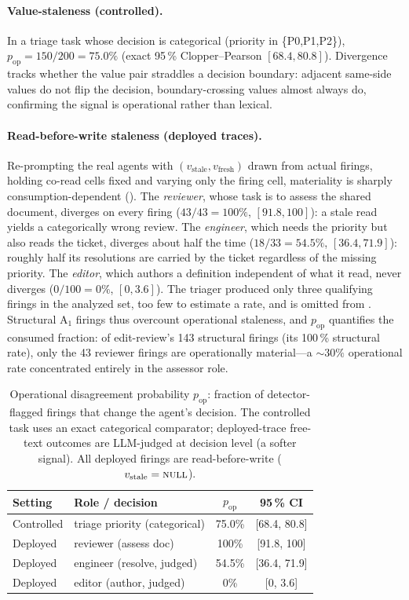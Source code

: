 \documentclass[journal,compsoc,10pt]{IEEEtran}
\theoremstyle{definition}
\theoremstyle{remark}
\begin{document}
\paragraph{Value-staleness (controlled).} In a triage task whose decision
is categorical (priority in \{P0,P1,P2\}), $p_{\text{op}} = 150/200 =
75.0\%$ (exact 95\,\% Clopper--Pearson $[68.4,80.8]$). Divergence tracks
whether the value pair straddles a decision boundary: adjacent same-side
values do not flip the decision, boundary-crossing values almost always
do, confirming the signal is operational rather than lexical.

\paragraph{Read-before-write staleness (deployed traces).} Re-prompting
the real agents with $(v_{\text{stale}},v_{\text{fresh}})$ drawn from
actual firings, holding co-read cells fixed and varying only the firing
cell, materiality is sharply consumption-dependent
(). The \emph{reviewer}, whose task is
to assess the shared document, diverges on every firing
($43/43=100\%$, $[91.8,100]$): a stale read yields a categorically wrong
review. The \emph{engineer}, which needs the priority but also reads the
ticket, diverges about half the time ($18/33=54.5\%$, $[36.4,71.9]$):
roughly half its resolutions are carried by the ticket regardless of the
missing priority. The \emph{editor}, which authors a definition
independent of what it read, never diverges ($0/100=0\%$, $[0,3.6]$). The
triager produced only three qualifying firings in the analyzed set,
too few to estimate a rate, and is omitted from
. Structural A$_1$ firings thus
overcount operational staleness, and $p_{\text{op}}$ quantifies the
consumed fraction: of edit-review's 143 structural firings (its 100\,\%
structural rate), only the 43 reviewer firings are operationally
material---a $\sim\!30\%$ operational rate concentrated entirely in the
assessor role.

\begin{table}[t]
\centering
\caption{Operational disagreement probability $p_{\text{op}}$: fraction of
detector-flagged firings that change the agent's decision. The controlled
task uses an exact categorical comparator; deployed-trace free-text
outcomes are LLM-judged at decision level (a softer signal). All deployed
firings are read-before-write ($v_{\text{stale}}=\textsc{null}$).}
\label{tab:operational-materiality}
\small
\begin{tabular}{llcc}
\toprule
Setting & Role / decision & $p_{\text{op}}$ & 95\,\% CI \\
\midrule
Controlled & triage priority (categorical) & 75.0\% & [68.4, 80.8] \\
Deployed   & reviewer (assess doc)          & 100\%  & [91.8, 100] \\
Deployed   & engineer (resolve, judged)     & 54.5\% & [36.4, 71.9] \\
Deployed   & editor (author, judged)        & 0\%    & [0, 3.6] \\
\bottomrule
\end{tabular}
\end{table}
\end{document}
